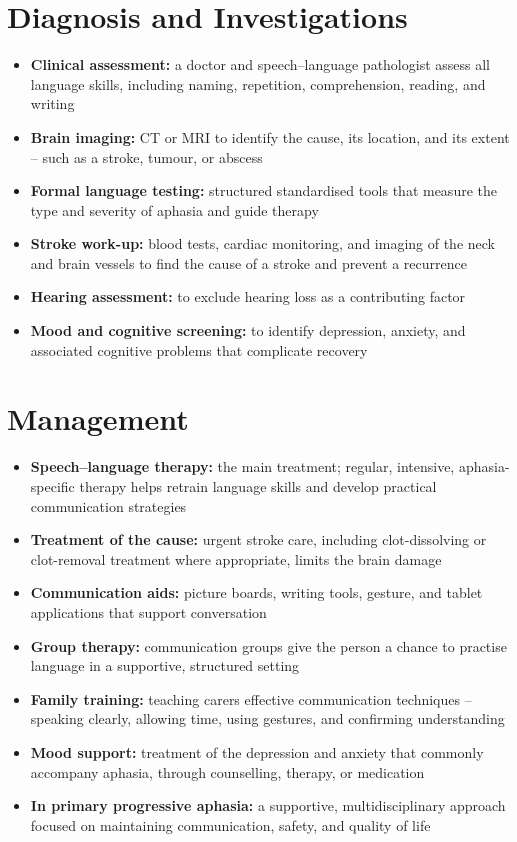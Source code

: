 \section*{Diagnosis and Investigations}
\begin{itemize}
    \item \textbf{Clinical assessment:} a doctor and speech--language pathologist assess all language skills, including naming, repetition, comprehension, reading, and writing
    \item \textbf{Brain imaging:} CT or MRI to identify the cause, its location, and its extent -- such as a stroke, tumour, or abscess
    \item \textbf{Formal language testing:} structured standardised tools that measure the type and severity of aphasia and guide therapy
    \item \textbf{Stroke work-up:} blood tests, cardiac monitoring, and imaging of the neck and brain vessels to find the cause of a stroke and prevent a recurrence
    \item \textbf{Hearing assessment:} to exclude hearing loss as a contributing factor
    \item \textbf{Mood and cognitive screening:} to identify depression, anxiety, and associated cognitive problems that complicate recovery
\end{itemize}

\section*{Management}
\begin{itemize}
    \item \textbf{Speech--language therapy:} the main treatment; regular, intensive, aphasia-specific therapy helps retrain language skills and develop practical communication strategies
    \item \textbf{Treatment of the cause:} urgent stroke care, including clot-dissolving or clot-removal treatment where appropriate, limits the brain damage
    \item \textbf{Communication aids:} picture boards, writing tools, gesture, and tablet applications that support conversation
    \item \textbf{Group therapy:} communication groups give the person a chance to practise language in a supportive, structured setting
    \item \textbf{Family training:} teaching carers effective communication techniques -- speaking clearly, allowing time, using gestures, and confirming understanding
    \item \textbf{Mood support:} treatment of the depression and anxiety that commonly accompany aphasia, through counselling, therapy, or medication
    \item \textbf{In primary progressive aphasia:} a supportive, multidisciplinary approach focused on maintaining communication, safety, and quality of life
\end{itemize}

